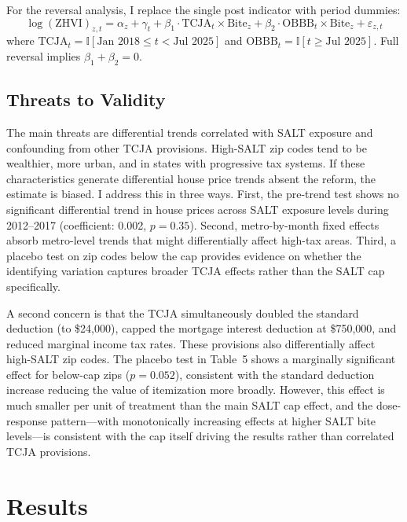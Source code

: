 \documentclass[12pt]{article}
\newcommand{\ind}{\mathbb{I}}
\begin{document}
For the reversal analysis, I replace the single post indicator with period dummies:
\begin{equation}
\log(\text{ZHVI})_{z,t} = \alpha_z + \gamma_t + \beta_1 \cdot \text{TCJA}_t \times \text{Bite}_z + \beta_2 \cdot \text{OBBB}_t \times \text{Bite}_z + \varepsilon_{z,t}
\end{equation}
where $\text{TCJA}_t = \ind[\text{Jan 2018} \leq t < \text{Jul 2025}]$ and $\text{OBBB}_t = \ind[t \geq \text{Jul 2025}]$. Full reversal implies $\beta_1 + \beta_2 = 0$.

\subsection{Threats to Validity}

The main threats are differential trends correlated with SALT exposure and confounding from other TCJA provisions. High-SALT zip codes tend to be wealthier, more urban, and in states with progressive tax systems. If these characteristics generate differential house price trends absent the reform, the estimate is biased. I address this in three ways. First, the pre-trend test shows no significant differential trend in house prices across SALT exposure levels during 2012--2017 (coefficient: 0.002, $p = 0.35$). Second, metro-by-month fixed effects absorb metro-level trends that might differentially affect high-tax areas. Third, a placebo test on zip codes below the cap provides evidence on whether the identifying variation captures broader TCJA effects rather than the SALT cap specifically.

A second concern is that the TCJA simultaneously doubled the standard deduction (to \$24,000), capped the mortgage interest deduction at \$750,000, and reduced marginal income tax rates. These provisions also differentially affect high-SALT zip codes. The placebo test in Table~5 shows a marginally significant effect for below-cap zips ($p = 0.052$), consistent with the standard deduction increase reducing the value of itemization more broadly. However, this effect is much smaller per unit of treatment than the main SALT cap effect, and the dose-response pattern---with monotonically increasing effects at higher SALT bite levels---is consistent with the cap itself driving the results rather than correlated TCJA provisions.

\section{Results}
\end{document}
